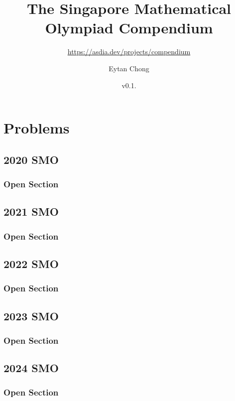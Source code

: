 \documentclass[a4paper, listof=totoc,bibliography=totoc,]{scrbook}
\title{The Singapore Mathematical Olympiad Compendium}
\subtitle{\url{https://asdia.dev/projects/compendium}}
\author{Eytan Chong}
\date{v0.1.\datetwo}
\begin{document}
\maketitle
\tableofcontents



\part{Problems}

\chapter{2020 SMO}
\section{Open Section}


\chapter{2021 SMO}
\section{Open Section}


\chapter{2022 SMO}
\section{Open Section}



\chapter{2023 SMO}
\section{Open Section}



\chapter{2024 SMO}
\section{Open Section}


\end{document}
